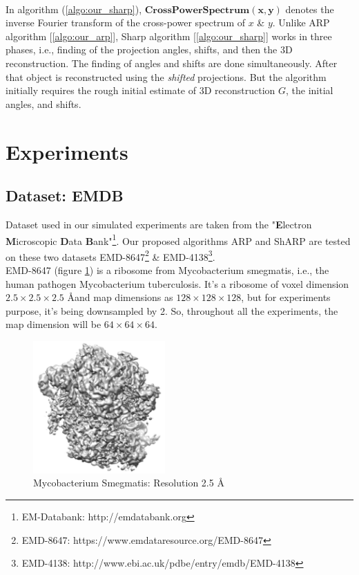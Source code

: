 \documentclass[twoside]{iitbreport}
\begin{document}
\hspace{1cm}\\
In algorithm (\ref{algo:our_sharp}), ${\boldsymbol{CrossPowerSpectrum(x,y)}}$ denotes the inverse Fourier transform of the cross-power spectrum of  $x$ \& $y$. Unlike ARP algorithm [\ref{algo:our_arp}], Sharp algorithm [\ref{algo:our_sharp}] works in three phases, i.e., finding of the projection angles, shifts, and then the 3D reconstruction. The finding of angles and shifts are done simultaneously. After that object is reconstructed using the \textit{shifted} projections. But the algorithm initially requires the rough initial estimate of 3D reconstruction $G$, the initial angles, and shifts.      

\section{Experiments}
\subsection{Dataset: EMDB}

Dataset used in our simulated experiments are taken from the "\textbf{E}lectron \textbf{M}icroscopic \textbf{D}ata \textbf{B}ank"\footnote{EM-Databank: http://emdatabank.org}. Our proposed algorithms ARP and ShARP are tested on these two datasets EMD-8647\footnote{EMD-8647: https://www.emdataresource.org/EMD-8647} \& EMD-4138\footnote{EMD-4138: http://www.ebi.ac.uk/pdbe/entry/emdb/EMD-4138}.\\  

EMD-8647 (figure \ref{fig:EMD-8647-3d-struct}) is a ribosome from Mycobacterium smegmatis, i.e., the human pathogen Mycobacterium tuberculosis. It's a ribosome of voxel dimension $2.5\times2.5\times2.5$ \AA and map dimensions as $128\times128\times128$, but for experiments purpose, it's being downsampled by 2. So, throughout all the experiments, the map dimension will be $64\times64\times64$.  

\begin{figure}[H]
\includegraphics[width=0.45\textwidth]{Emd_8647.png}
\centering
\captionsetup{justification=centering}
\caption{Mycobacterium Smegmatis: Resolution 2.5 \AA }
\label{fig:EMD-8647-3d-struct}
\end{figure}
\end{document}
